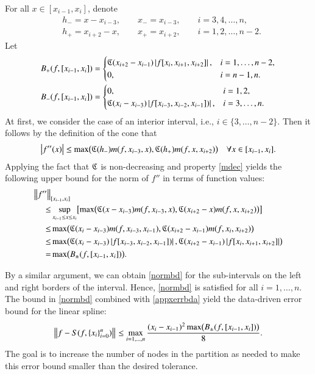 \documentclass[review]{elsarticle}
\newcommand{\datasites}{\{x_i\}_{i=0}^n}
\theoremstyle{definition}
\begin{document}
For all $ x \in [x_{i-1},x_i]$,  denote
\begin{align*}
&h_- = x - x_{i-3}, \qquad x_- = x_{i-3},  \qquad i=3,4,\ldots,n,\\
 &h_+ = x_{i+2} - x, \qquad x_+ =  x_{i+2}, \qquad i=1,2,\ldots,n-2.
\end{align*}
Let
\begin{align}\label{bpf}
B_{+}(f,[x_{i-1},x_i])&=\begin{cases}
    \mathfrak{C}(x_{i+2}-x_{i-1})\left \lvert f[x_i,x_{i+1},x_{i+2}] \right \rvert,  & i=1,\ldots,n-2,
\\ 0, & i=n-1,n.
\end{cases}\\
\label{bmf}
 B_{-}(f,[x_{i-1},x_i])&=\begin{cases}
   0,  & i=1,2,
\\ \mathfrak{C}(x_{i}-x_{i-3})\left \lvert f[x_{i-3},x_{i-2},x_{i-1}]) \right \rvert, & i=3,\ldots,n.
\end{cases}
\end{align}
At first, we consider the case of an interior interval, i.e., $i \in \{3, \ldots, n-2\}$. Then it follows by the definition of the cone that
\begin{equation*}
\left \lvert f''(x) \right \rvert \le \max\bigl(\mathfrak{C}(h_-)m(f,x_{i-3},x),\mathfrak{C}(h_+)m(f,x,x_{i+2})\bigr)  \quad  \forall x \in [x_{i-1},x_i].
\end{equation*}
Applying the fact that $\mathfrak{C}$ is non-decreasing and property \eqref{mdec} yields
the following upper bound for the norm of $f''$ in terms of function values:
\begin{align}\label{normbd}
\nonumber
\MoveEqLeft{\norm[{[x_{i-1},x_i]}]{f''}}\\
\nonumber
 \le  & \sup_{x_{i-1} \le x \le x_i} \bigl[\max\bigl(\fC(x-x_{i-3})m(f,x_{i-3},x),\fC(x_{i+2}-x)m(f,x,x_{i+2})\bigr)\bigr]  \\
\nonumber
 \le  &  \max\bigl(\fC(x_{i}-x_{i-3})m(f,x_{i-3},x_{i-1}),\fC(x_{i+2}-x_{i-1})m(f,x_i,x_{i+2})\bigr) \\
\nonumber  \le & \max\bigl(\fC(x_{i}-x_{i-3})\abs{f[x_{i-3},x_{i-2},x_{i-1}])},\bigr.
 \fC(x_{i+2}-x_{i-1})\abs{f[x_i,x_{i+1},x_{i+2}]}\bigr) \\
 =  & \max\bigl(B_{\pm}(f,[x_{i-1},x_i])\bigr).
\end{align}

By a similar argument, we can obtain \eqref{normbd} for the sub-intervals on the left and right borders of the interval. Hence,
\eqref{normbd} is satisfied for all $i=1,\ldots,n$.
The bound in \eqref{normbd} combined with \eqref{appxerrbda} yield the
data-driven error bound for the linear spline:
\begin{equation} \label{appxerrbdb}
\norm{f - S(f,\datasites)} \le
\max_{i=1, \ldots, n} \frac{(x_i - x_{i-1})^2\max\bigl(B_{\pm}(f,[x_{i-1},x_i])\bigr)}{8} .
\end{equation}
The goal is to increase the number of nodes in the partition as needed to make
this error bound smaller than the desired tolerance.
\end{document}
